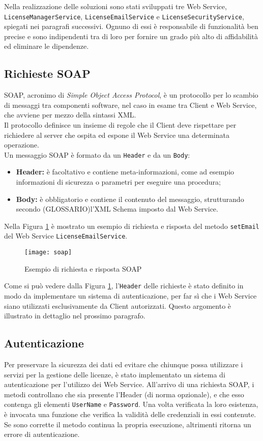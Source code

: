 Nella realizzazione delle soluzioni sono stati sviluppati tre Web Service,\\ \texttt{LicenseManagerService}, \texttt{LicenseEmailService} e \texttt{LicenseSecurityService}, spiegati nei paragrafi successivi. Ognuno di essi è responsabile di funzionalità ben precise e sono indipendenti tra di loro per fornire un grado più alto di affidabilità ed eliminare le dipendenze.


\subsection{Richieste SOAP}
\label{soap}
SOAP, acronimo di \textit{Simple Object Access Protocol}, è un protocollo per lo scambio di messaggi tra componenti software, nel caso in esame tra Client e Web Service, che avviene per mezzo della sintassi XML. \\
Il protocollo definisce un insieme di regole che il Client deve rispettare per richiedere al server che ospita ed espone il Web Service una determinata operazione.
\\
Un messaggio SOAP è formato da un \texttt{Header} e da un \texttt{Body}:
\begin{itemize}
\item \textbf{Header:} è facoltativo e contiene meta-informazioni, come ad esempio informazioni di sicurezza o parametri per eseguire una procedura;
\item \textbf{Body:} è obbligatorio e contiene il contenuto del messaggio, strutturando secondo (GLOSSARIO)l'XML Schema imposto dal Web Service.
\end{itemize}

Nella Figura \ref{soap} è mostrato un esempio di richiesta e risposta del metodo \texttt{setEmail} del Web Service \texttt{LicenseEmailService}.

\begin{figure}[!h] 
    \centering 
    \texttt{[image: soap]} 
    \caption{Esempio di richiesta e risposta SOAP}
    \label{soap}
\end{figure}

Come si può vedere dalla Figura \ref{soap}, l'\texttt{Header} delle richieste è stato definito in modo da implementare un sistema
di autenticazione, per far sì che i Web Service siano utilizzati esclusivamente da Client autorizzati. Questo argomento è illustrato in dettaglio nel prossimo paragrafo.

\subsection{Autenticazione}
Per preservare la sicurezza dei dati ed evitare che chiunque possa utilizzare i servizi per la gestione delle licenze, è stato implementato un sistema di autenticazione per l'utilizzo dei Web Service. All'arrivo di una richiesta SOAP, i metodi controllano che sia presente l'Header (di norma opzionale), e che esso contenga gli elementi \texttt{UserName} e \texttt{Password}. Una volta verificata la loro esistenza, è invocata una funzione che verifica la validità delle credenziali in essi contenute. Se sono corrette il metodo continua la propria esecuzione, altrimenti ritorna un errore di autenticazione.

